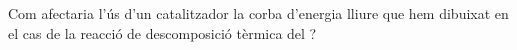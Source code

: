 \begin{exr}
Com afectaria l'ús d'un catalitzador la corba d'energia lliure que hem dibuixat en el cas de la reacció de descomposició tèrmica del ?
\end{exr}